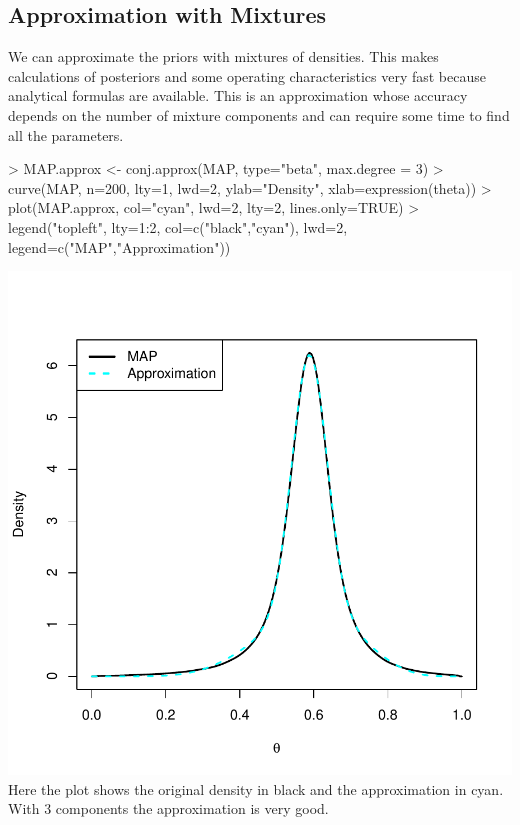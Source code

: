 \documentclass{article}
\begin{document}
\subsection{Approximation with Mixtures}
We can approximate the priors with mixtures of densities. This makes calculations of posteriors and some operating characteristics very fast because analytical formulas are available. This is an approximation whose accuracy depends on the number of mixture components and can require some time to find all the parameters.

\begin{Schunk}
\begin{Sinput}
> MAP.approx <- conj.approx(MAP, type="beta", max.degree = 3)
> curve(MAP, n=200, lty=1, lwd=2, ylab="Density", xlab=expression(theta))
> plot(MAP.approx,  col="cyan", lwd=2, lty=2, lines.only=TRUE)
> legend("topleft", lty=1:2, col=c("black","cyan"), lwd=2, legend=c("MAP","Approximation"))
\end{Sinput}
\end{Schunk}
\includegraphics{Binomial-approx}
\\

Here the plot shows the original density in black and the approximation in cyan. With 3 components the approximation is very good.
\end{document}

